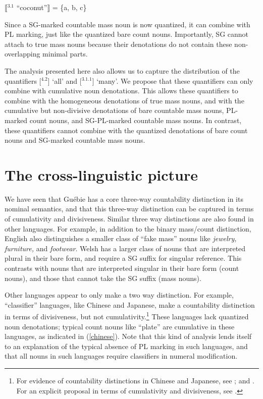 \documentclass[output=paper,colorlinks,citecolor=brown]{langscibook}
\begin{document}
\ea%
    \label{ex:sande:20}
    $\llbracket$$^{3.1}$ ``coconut''$\rrbracket$ = \{a, b, c\}
\z

Since a SG-marked countable mass noun is now quantized, it can combine with PL marking, just like the quantized bare count nouns. Importantly, SG cannot attach to true mass nouns because their denotations do not contain these non-overlapping minimal parts.

The analysis presented here also allows us to capture the distribution of the quantifiers [$^{4.2}$] `all' and [$^{3.1.1}$] `many'. We propose that these quantifiers can only combine with cumulative noun denotations. This allows these quantifiers to combine with the homogeneous denotations of true mass nouns, and with the cumulative but non-divisive denotations of bare countable mass nouns, PL-marked count nouns, and SG-PL-marked countable mass nouns. In contrast, these quantifiers cannot combine with the quantized denotations of bare count nouns and SG-marked countable mass nouns.


\section{The cross-linguistic picture}\label{sec:sande:4}

We have seen that Guébie has a core three-way countability distinction in its nominal semantics, and that this three-way distinction can be captured in terms of cumulativity and divisiveness. Similar three way distinctions are also found in other languages. For example, in addition to the binary mass/count distinction, English also distinguishes a smaller class of ``fake mass'' nouns like \textit{jewelry, furniture,} and \textit{footwear}.
Welsh \citep{Grimm2012Chapter} has a larger class of nouns that are interpreted plural in their bare form, and require a SG suffix for singular reference. This contrasts with nouns that are interpreted singular in their bare form (count nouns), and those that cannot take the SG suffix (mass nouns).

Other languages appear to only make a two way distinction. For example, ``classifier'' languages, like Chinese and Japanese, make a countability distinction in terms of divisiveness, but not cumulativity.\footnote{For evidence of countability distinctions in Chinese and Japanese, see \citealt{ChengSybesma1998, InagakiBarner2009}; and \citealt{CheungEtAl2010}. For an explicit proposal in terms of cumulativity and divisiveness, see \citealt{Deal2017}.} These languages lack quantized noun denotations; typical count nouns like ``plate'' are cumulative in these languages, as indicated in (\ref{chinese}). Note that this kind of analysis lends itself to an explanation of the typical absence of PL marking in such languages, and that all nouns in such languages require classifiers in numeral modification.
\end{document}

